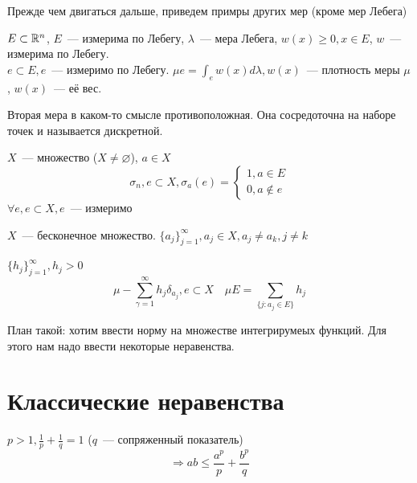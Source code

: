 \documentclass[document]{subfiles}
\begin{document}
Прежде чем двигаться дальше, приведем примры других мер (кроме мер Лебега)
\begin{example}
    $E \subset \mathbb{R}^n$, $E$~--- измерима по Лебегу, $\lambda$~--- мера Лебега, $w(x) \geq 0, x \in E$, $w$~--- измерима по Лебегу. \\
    
    $e \subset E, e$~--- измеримо по Лебегу.
    $ \mu e = \int_e w(x) d \lambda, w(x)$~--- плотность меры $\mu$, $w(x)$~--- её вес.
\end{example}
Вторая мера в каком-то смысле противоположная. Она сосредоточна на наборе точек и называется дискретной.
\begin{example}
    $X$~--- множество ($X \ne \varnothing$), $a \in X$
    \[ \sigma_n, e \subset X, \sigma_a(e) = \begin{cases}
        1, a \in E \\
        0, a \notin e 
    \end{cases} \] 
    $\forall e, e \subset  X, e$~--- измеримо
\end{example}

\begin{example}
    $X$~--- бесконечное множество. $ \{ a_j \}_{j=1}^\infty, a_j \in X, a_j \ne a_k, j \ne k$ 
    
    $\{h_j \}^\infty_{j=1}, h_j > 0$ 
    \[ \mu - \sum^\infty_{\gamma = 1} h_j \delta_{a_j}, e \subset X \quad \mu E = \sum_{\{ j: a_j \in E \}} h_j \]
\end{example}

План такой: хотим ввести норму на множестве интегрирумеых функций. Для этого нам надо ввести некоторые неравенства.
\section{Классические неравенства}

\begin{theorem}
    $p > 1, \frac{1}{p} + \frac{1}{q} = 1$ ($q$~--- сопряженный показатель)
    \[ \Rightarrow ab \leq \frac{a^p}{p} + \frac{b^p}{q} \]
\end{theorem}
\end{document}
